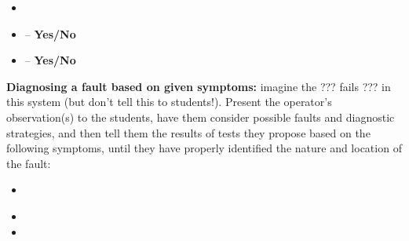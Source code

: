 \begin{itemize}
\item{} {\it }
\item{}  -- {\bf Yes/No}
\item{}  -- {\bf Yes/No}
\end{itemize}


\vskip 10pt


\noindent
{\bf Diagnosing a fault based on given symptoms:} imagine the ??? fails ??? in this system (but don't tell this to students!).  Present the operator's observation(s) to the students, have them consider possible faults and diagnostic strategies, and then tell them the results of tests they propose based on the following symptoms, until they have properly identified the nature and location of the fault:

\begin{itemize}
\item{} {\it }
\item{} 
\item{} 
\end{itemize}




